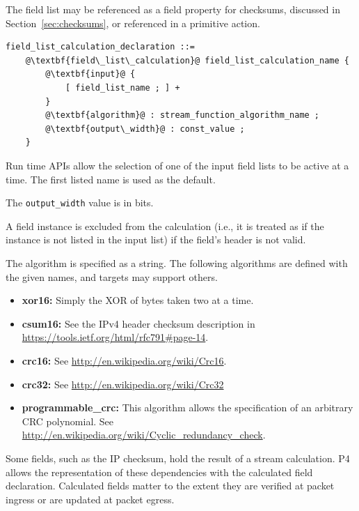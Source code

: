 \documentclass[12pt]{article}
\begin{document}
The field list may be referenced as a field property for checksums,
discussed in Section~\ref{sec:checksums}, or referenced in a primitive action.

\begin{lstlisting}[frame=single,backgroundcolor=\color{bnfgreen},escapechar=\@]
field_list_calculation_declaration ::=
    @\textbf{field\_list\_calculation}@ field_list_calculation_name {
        @\textbf{input}@ {
            [ field_list_name ; ] +
        }
        @\textbf{algorithm}@ : stream_function_algorithm_name ;
        @\textbf{output\_width}@ : const_value ;
    }
\end{lstlisting}

Run time APIs allow the selection of one of the input field lists to
be active at a time. The first listed name is used as the default.

The \texttt{output_width} value is in bits.

A field instance is excluded from the calculation (i.e., it is treated as
if the instance is not listed in the input list) if the field's header
is not valid.

The algorithm is specified as a string.  The following algorithms are
defined with the given names, and targets may support others.

\begin{itemize}
\item
\textbf{xor16:} Simply the XOR of bytes taken two at a time.
\item
\textbf{csum16:}  See the IPv4 header checksum description in \\
\url{https://tools.ietf.org/html/rfc791\#page-14}.
\item
\textbf{crc16:} See \url{http://en.wikipedia.org/wiki/Crc16}.
\item
\textbf{crc32:} See \url{http://en.wikipedia.org/wiki/Crc32}
\item
\textbf{programmable_crc:}  This algorithm allows the specification
of an arbitrary CRC polynomial.  See
\url{http://en.wikipedia.org/wiki/Cyclic_redundancy_check}.
\end{itemize}


Some fields, such as the IP checksum, hold the result of a stream
calculation.  P4 allows the representation of these dependencies with
the calculated field declaration. Calculated fields matter to the
extent they are verified at packet ingress or are updated at packet
egress.
\end{document}
